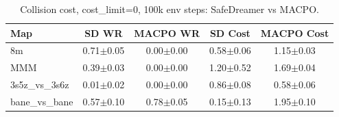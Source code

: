\documentclass{article}
\begin{document}
\begin{table}[h]
\centering
\caption{Collision cost, cost\_limit=0, 100k env steps: SafeDreamer vs MACPO.}
\begin{tabular}{lcccc}
\toprule
\textbf{Map} & \textbf{SD WR} & \textbf{MACPO WR} & \textbf{SD Cost} & \textbf{MACPO Cost} \\
\midrule
  8m & 0.71$\pm$0.05 & 0.00$\pm$0.00 & 0.58$\pm$0.06 & 1.15$\pm$0.03 \\
  MMM & 0.39$\pm$0.03 & 0.00$\pm$0.00 & 1.20$\pm$0.52 & 1.69$\pm$0.04 \\
  3s5z\_vs\_3s6z & 0.01$\pm$0.02 & 0.00$\pm$0.00 & 0.86$\pm$0.08 & 0.58$\pm$0.06 \\
  bane\_vs\_bane & 0.57$\pm$0.10 & 0.78$\pm$0.05 & 0.15$\pm$0.13 & 1.95$\pm$0.10 \\
\bottomrule
\end{tabular}
\end{table}
\end{document}
